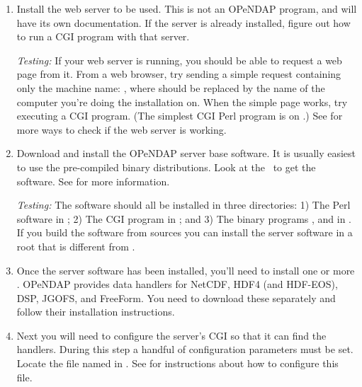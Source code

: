 \documentclass{dods-book}
\begin{document}
\begin{enumerate}
\item Install the web server to be used.  This is not an OPeNDAP program,
  and will have its own documentation.  If the server is already
  installed, figure out how to run a CGI program with that server.
  
  \emph{Testing:} If your web server is running, you should be able to
  request a web page from it. From a web browser, try sending a simple
  request containing only the machine name: ,
  where  should be replaced by the name of the computer
  you're doing the installation on. When the simple page works, try
  executing a CGI program. (The simplest CGI Perl program is on
  \pageref{simple,perl}.) See
   for more ways to check if the web server
  is working.

\item Download and install the OPeNDAP server base software. It is
  usually easiest to use the pre-compiled binary distributions. Look
  at the \DODShome\ to get the software. See  for more
  information.
  
%

  \emph{Testing:} The software should all be installed in three
  directories: 1) The Perl software in
  ; 2) The CGI program in
  ; and 3) The binary programs
  ,  and  in
  . If you build the software from sources you can
  install the server software in a root that is different from
  .


\item Once the server software has been installed, you'll need to
  install one or more . OPeNDAP provides data
  handlers for NetCDF, HDF4 (and HDF-EOS), DSP, JGOFS, and FreeForm.
  You need to download these separately and follow their installation
  instructions.

\item Next you will need to configure the server's CGI so that it can
  find the handlers. During this step a handful of configuration
  parameters must be set. Locate the file named  in
  .
  See  for instructions about how to
  configure this file.


\end{enumerate}
\end{document}
